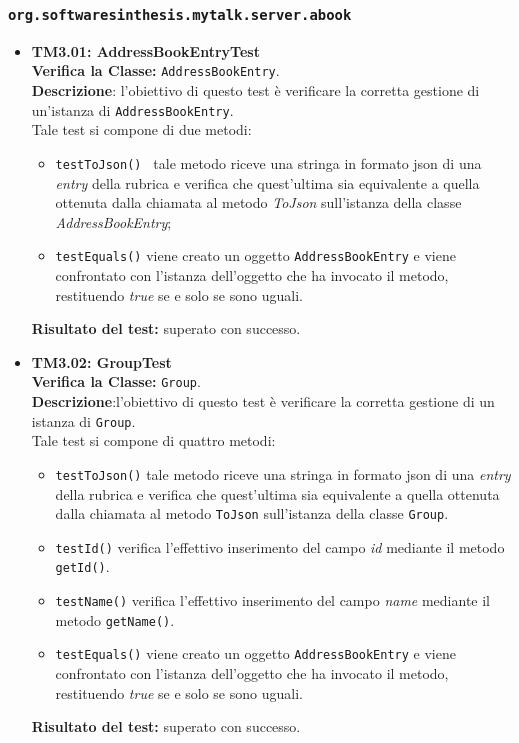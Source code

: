 \subsubsection{\texttt{org.softwaresinthesis.mytalk.server.abook}}
\begin{itemize}
\item \textbf{TM3.01: AddressBookEntryTest}\\
\textbf{Verifica la Classe:} \texttt{AddressBookEntry}.\\
\textbf{Descrizione}: l'obiettivo di questo test è verificare la corretta gestione di un'istanza di \texttt{AddressBookEntry}.\\
Tale test si compone di due metodi:
\begin{itemize}
\item \texttt{testToJson() } tale metodo riceve una stringa in formato json di una 	\textit{entry} della rubrica e verifica che quest'ultima sia equivalente a quella ottenuta dalla chiamata al metodo \textit{ToJson} sull'istanza della classe \textit{AddressBookEntry};
\item\texttt{testEquals()} viene creato un oggetto \texttt{AddressBookEntry} e viene confrontato con l'istanza dell'oggetto che ha invocato il metodo, restituendo \textit{true} se e solo se sono uguali.
\end{itemize}
\textbf{Risultato del test:} superato con successo.

\item \textbf{TM3.02: GroupTest}\\
\textbf{Verifica la Classe:} \texttt{Group}.\\
\textbf{Descrizione}:l'obiettivo di questo test è verificare la corretta gestione di un istanza di \texttt{Group}.\\
Tale test si compone di quattro metodi:
\begin{itemize}
\item \texttt{testToJson()} tale metodo riceve una stringa in formato json di una \textit{entry} della rubrica e verifica che quest'ultima sia equivalente a quella ottenuta dalla chiamata al metodo \texttt{ToJson} sull'istanza della classe \texttt{Group}.
\item \texttt{testId()} verifica l'effettivo inserimento del campo \textit{id} mediante il metodo \texttt{getId()}.
\item \texttt{testName()} verifica l'effettivo inserimento del campo \textit{name} mediante il metodo \texttt{getName()}.
\item \texttt{testEquals()} viene creato un oggetto \texttt{AddressBookEntry} e viene confrontato con l'istanza dell'oggetto che ha invocato il metodo, restituendo \textit{true} se e solo se sono uguali.
\end{itemize}
\textbf{Risultato del test:} superato con successo.


\end{itemize}
